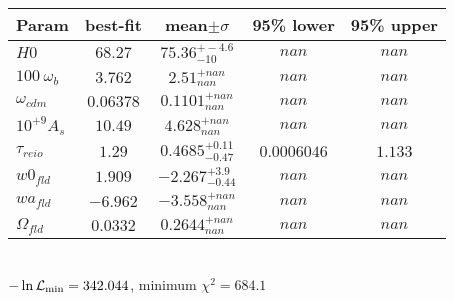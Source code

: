 \begin{tabular}{|l|c|c|c|c|} 
 \hline 
Param & best-fit & mean$\pm\sigma$ & 95\% lower & 95\% upper \\ \hline 
$H0$ &$68.27$ & $75.36_{-10}^{+-4.6}$ & $nan$ & $nan$ \\ 
$100~\omega_{b }$ &$3.762$ & $2.51_{nan}^{+nan}$ & $nan$ & $nan$ \\ 
$\omega_{cdm }$ &$0.06378$ & $0.1101_{nan}^{+nan}$ & $nan$ & $nan$ \\ 
$10^{+9}A_{s }$ &$10.49$ & $4.628_{nan}^{+nan}$ & $nan$ & $nan$ \\ 
$\tau_{reio }$ &$1.29$ & $0.4685_{-0.47}^{+0.11}$ & $0.0006046$ & $1.133$ \\ 
$w0_{fld }$ &$1.909$ & $-2.267_{-0.44}^{+3.9}$ & $nan$ & $nan$ \\ 
$wa_{fld }$ &$-6.962$ & $-3.558_{nan}^{+nan}$ & $nan$ & $nan$ \\ 
$\Omega_{fld }$ &$0.0332$ & $0.2644_{nan}^{+nan}$ & $nan$ & $nan$ \\ 
\hline 
 \end{tabular} \\ 
$-\ln{\cal L}_\mathrm{min} =342.044$, minimum $\chi^2=684.1$ \\ 
